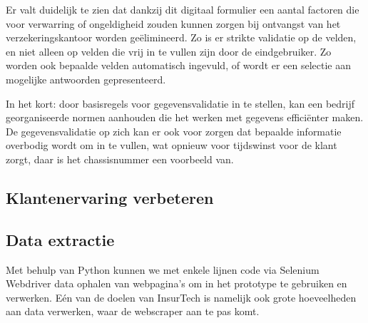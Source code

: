 
Er valt duidelijk te zien dat dankzij dit digitaal formulier een aantal factoren die voor verwarring of ongeldigheid zouden kunnen zorgen bij ontvangst van het verzekeringskantoor worden geëlimineerd.
Zo is er strikte validatie op de velden, en niet alleen op velden die vrij in te vullen zijn door de eindgebruiker.
Zo worden ook bepaalde velden automatisch ingevuld, of wordt er een selectie aan mogelijke antwoorden gepresenteerd.

In het kort:
door basisregels voor gegevensvalidatie in te stellen, kan een bedrijf georganiseerde normen aanhouden die het werken met gegevens efficiënter maken.
De gegevensvalidatie op zich kan er ook voor zorgen dat bepaalde informatie overbodig wordt om in te vullen, wat opnieuw voor tijdswinst voor de klant zorgt, daar is het chassisnummer een voorbeeld van.


\subsection{Klantenervaring verbeteren}



\subsection{Data extractie}
Met behulp van Python kunnen we met enkele lijnen code via Selenium Webdriver data ophalen van webpagina's om in het prototype te gebruiken en verwerken.
Eén van de doelen van InsurTech is namelijk ook grote hoeveelheden aan data verwerken, waar de webscraper aan te pas komt.


